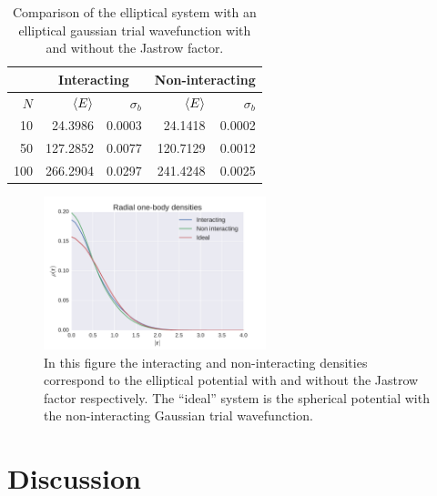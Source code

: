 \documentclass[
    a4paper, aps, twocolumn, floatfix, superscriptaddress,
    nofootinbib]{revtex4-1}
\newcommand{\1}{\mathds{1}}
\begin{document}
            \begin{table}
                \caption{Comparison of the elliptical system with an elliptical
                gaussian trial wavefunction with and without the Jastrow
                factor.}
                \centering
                \begin{ruledtabular}
                    \begin{tabular}{r|rr|rr}
                        & \multicolumn{2}{c|}{Interacting}
                        & \multicolumn{2}{c}{Non-interacting} \\
                        \hline
                        $N$ & $\expval{E}$ & $\sigma_b$ & $\expval{E}$
                        & $\sigma_b$ \\
                        \hline
                        10 & 24.3986 & 0.0003 & 24.1418 & 0.0002 \\
                        50 & 127.2852 & 0.0077 & 120.7129 & 0.0012 \\
                        100 & 266.2904 & 0.0297 & 241.4248 & 0.0025
                    \end{tabular}
                \end{ruledtabular}
                \label{tab:10_optimal}
            \end{table}

            \begin{figure}
                \includegraphics[width=244px]
                {../data/figures/problem_g_100N.pdf}
                \caption{In this figure the interacting and non-interacting
                densities correspond to the elliptical potential with and
                without the Jastrow factor respectively. The ``ideal'' system is
                the spherical potential with the non-interacting Gaussian trial
                wavefunction.}
                \label{fig:one_body_density_100}
            \end{figure}


\section{Discussion}
\end{document}
